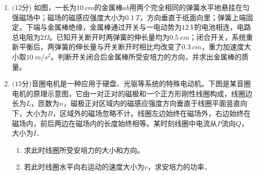 \begin{enumerate}




\newpage
\item
{}
$ (12 $分) 如图，一长为$ 10 \ cm $的金属棒$ ab $用两个完全相同的弹簧水平地悬挂在匀强磁场中；磁场的磁感应强度大小为$ 0.1 \ T $，方向垂直于纸面向里；弹簧上端固定，下端与金属棒绝缘，金属棒通过开关与一电动势为$ 12 \ V $的电池相连，电路总电阻为$ 2 \Omega $。已知开关断开时两弹簧的伸长量均为$ 0.5 \ cm $；闭合开关，系统重新平衡后，两弹簧的伸长量与开关断开时相比均改变了$ 0.3 \ cm $，重力加速度大小取$ 10 \ m/s ^{2} $。判断开关闭合后金属棒所受安培力的方向，并求出金属棒的质量。
\begin{figure}[h!]
\flushright

\end{figure}









\newpage
\item
{}
$ (15 $分)音圈电机是一种应用于硬盘、光驱等系统的特殊电动机。下图是某音圈电机的原理示意图，它由一对正对的磁极和一个正方形刚性线圈构成，线圈边长为$ L $，匝数为$ n $，磁极正对区域内的磁感应强度方向垂直于线圈平面竖直向下，大小为$ B $，区域外的磁场忽略不计。线圈左边始终在磁场外，右边始终在磁场内，前后两边在磁场内的长度始终相等。某时刻线圈中电流从$ P $流向$ Q $，大小为$ I $．
\begin{enumerate}
\renewcommand{\labelenumi}{\arabic{enumi}.}
\item
求此时线圈所受安培力的大小和方向。
\item 
若此时线圈水平向右运动的速度大小为$ v $，求安培力的功率．




\end{enumerate}
\end{enumerate}
